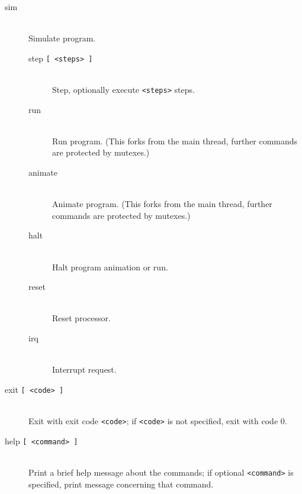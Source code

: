 \begin{description}
            \item[sim]~\\
                Simulate program.
                \begin{description}
                    \item[step \texttt{{[} <steps> {]}}]~\\
                        Step, optionally execute \texttt{<steps>} steps.
                    \item[run]~\\
                        Run program. (This forks from the main thread, further commands are protected by mutexes.)
                    \item[animate]~\\
                        Animate program. (This forks from the main thread, further commands are protected by mutexes.)
                    \item[halt]~\\
                        Halt program animation or run.
                    \item[reset]~\\
                        Reset processor.
                    \item[irq]~\\
                        Interrupt request.
                \end{description}

            \item[exit \texttt{{[} <code> {]}}]~\\
                Exit with exit code \texttt{<code>}; if \texttt{<code>} is not specified, exit with code 0.

            \item[help \texttt{{[} <command> {]}}]~\\
                Print a brief help message about the commands; if optional \texttt{<command>} is specified, print message concerning that command.
        \end{description}

